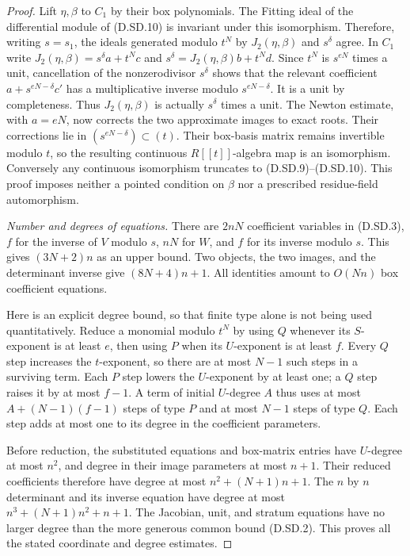 \begin{proof}
Lift $\eta,\beta$ to $C_1$ by their box polynomials.
The Fitting ideal of the differential module of (D.SD.10)
is invariant under this isomorphism.  Therefore, writing
$s=s_1$, the ideals generated modulo $t^N$ by
$J_2(\eta,\beta)$ and $s^\delta$ agree.
In $C_1$ write
$J_2(\eta,\beta)=s^\delta a+t^N c$ and
$s^\delta=J_2(\eta,\beta)b+t^N d$.
Since $t^N$ is $s^{eN}$ times a unit, cancellation of the
nonzerodivisor $s^\delta$ shows that the relevant coefficient
$a+s^{eN-\delta}c'$ has a multiplicative inverse modulo
$s^{eN-\delta}$.  It is a unit by completeness.
Thus $J_2(\eta,\beta)$ is actually $s^\delta$ times a unit.
The Newton estimate, with $a=eN$, now corrects the two
approximate images to exact roots.  Their corrections lie
in $(s^{eN-\delta})\subset(t)$.
Their box-basis matrix remains invertible modulo $t$,
so the resulting continuous $R[[t]]$-algebra map is an
isomorphism.  Conversely any continuous isomorphism truncates
to (D.SD.9)--(D.SD.10).
This proof imposes neither a pointed condition on $\beta$
nor a prescribed residue-field automorphism.

\emph{Number and degrees of equations.}
There are $2nN$ coefficient variables in (D.SD.3), $f$ for
the inverse of $V$ modulo $s$, $nN$ for $W$, and $f$ for
its inverse modulo $s$.  This gives $(3N+2)n$ as an upper
bound.  Two objects, the two images, and the determinant
inverse give $(8N+4)n+1$.  All identities amount to
$O(Nn)$ box coefficient equations.

Here is an explicit degree bound, so that finite type alone
is not being used quantitatively.  Reduce a monomial modulo
$t^N$ by using $Q$ whenever its $S$-exponent is at least $e$,
then using $P$ when its $U$-exponent is at least $f$.
Every $Q$ step increases the $t$-exponent, so there are at
most $N-1$ such steps in a surviving term.
Each $P$ step lowers the $U$-exponent by at least one;
a $Q$ step raises it by at most $f-1$.
A term of initial $U$-degree $A$ thus uses at most
$A+(N-1)(f-1)$ steps of type $P$ and at most $N-1$
steps of type $Q$.  Each step adds at most one to its
degree in the coefficient parameters.

Before reduction, the substituted equations and box-matrix
entries have $U$-degree at most $n^2$, and degree in
their image parameters at most $n+1$.
Their reduced coefficients therefore have degree at most
$n^2+(N+1)n+1$.
The $n$ by $n$ determinant and its inverse equation have
degree at most $n^3+(N+1)n^2+n+1$.
The Jacobian, unit, and stratum equations have no larger
degree than the more generous common bound (D.SD.2).
This proves all the stated coordinate and degree estimates.
\end{proof}

